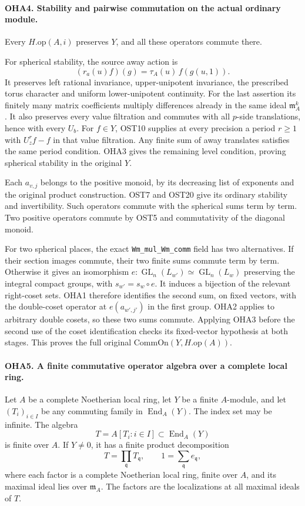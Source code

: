 \paragraph{OHA4. Stability and pairwise commutation on the actual ordinary module.}
\label{claim:OHA4}
Every \(H.\mathrm{op}(A,i)\) preserves \(Y\), and all these
operators commute there.

For spherical stability, the source away action is
\[
       (r_a(u)f)(g)=\tau_A(u)\,f(g(u,1)).
\]
It preserves left rational invariance, upper-unipotent invariance,
the prescribed torus character and uniform lower-unipotent
continuity. For the last assertion its finitely many matrix
coefficients multiply differences already in the same ideal
\(\mathfrak m_A^k\). It also preserves every value filtration
and commutes with all \(p\)-side translations, hence with every
\(U_b\). For \(f\in Y\), OST10 supplies at every precision a
period \(r\ge1\) with \(U_z^rf-f\) in that value filtration.
Any finite sum of away translates satisfies the same period
condition. OHA3 gives the remaining level condition, proving
spherical stability in the original \(Y\).

Each \(a_{v,j}\) belongs to the positive monoid, by its decreasing
list of exponents and the original product construction.
OST7 and OST20 give its ordinary stability and invertibility.
Such operators commute with the spherical sums term by term.
Two positive operators commute by OST5 and commutativity of the
diagonal monoid.

For two spherical places, the exact \texttt{Wm\_mul\_Wm\_comm}
field has two alternatives. If their section images commute,
their two finite sums commute term by term. Otherwise it gives
an isomorphism \(e:\operatorname{GL}_n(L_{w'})
\simeq\operatorname{GL}_n(L_w)\) preserving the integral compact
groups, with \(s_{w'}=s_w\circ e\). It induces a bijection of
the relevant right-coset sets. OHA1 therefore identifies the
second sum, on fixed vectors, with the double-coset operator
at \(e(a_{w',j'})\) in the first group. OHA2 applies to arbitrary
double cosets, so these two sums commute. Applying OHA3 before
the second use of the coset identification checks its fixed-vector
hypothesis at both stages. This proves the full original
\(\mathrm{CommOn}(Y,H.\mathrm{op}(A))\).

\paragraph{OHA5. A finite commutative operator algebra over a complete local ring.}
\label{claim:OHA5}
Let \(A\) be a complete Noetherian local ring, let \(Y\) be a
finite \(A\)-module, and let \((T_i)_{i\in I}\) be any commuting
family in \(\operatorname{End}_A(Y)\). The index set may be
infinite. The algebra
\[
                      T=A[T_i:i\in I]\subset\operatorname{End}_A(Y)
\]
is finite over \(A\). If \(Y\ne0\), it has a finite product
decomposition
\[
                 T=\prod_{\mathfrak q}T_{\mathfrak q},
                 \qquad 1=\sum_{\mathfrak q}e_{\mathfrak q},
\]
where each factor is a complete Noetherian local ring, finite
over \(A\), and its maximal ideal lies over \(\mathfrak m_A\).
The factors are the localizations at all maximal ideals of \(T\).

